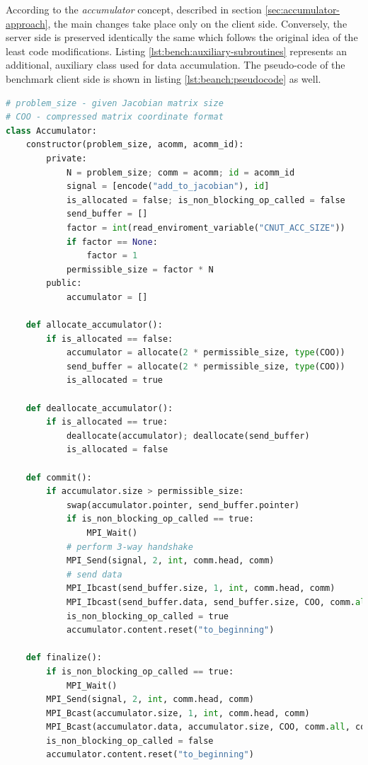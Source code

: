 According to the \textit{accumulator} concept, described in section \ref{sec:accumulator-approach}, the main changes take place only on the client side. Conversely, the server side is preserved identically the same which follows the original idea of the least code modifications. Listing \ref{lst:bench:auxiliary-subroutines} represents an additional, auxiliary class used for data accumulation. The pseudo-code of the benchmark client side is shown in listing \ref{lst:beanch:pseudocode} as well.\\ 


\begin{minipage}{\linewidth}
\begin{lstlisting}[language=python, caption={Pseudocode of the auxiliary class}, frame=single, label={lst:bench:auxiliary-subroutines}]
# problem_size - given Jacobian matrix size
# COO - compressed matrix coordinate format
class Accumulator:
	constructor(problem_size, acomm, acomm_id):
		private:
			N = problem_size; comm = acomm; id = acomm_id
			signal = [encode("add_to_jacobian"), id]
			is_allocated = false; is_non_blocking_op_called = false
			send_buffer = []
			factor = int(read_enviroment_variable("CNUT_ACC_SIZE"))
			if factor == None:
				factor = 1	
			permissible_size = factor * N	
		public: 
			accumulator = []
		
	def allocate_accumulator():
		if is_allocated == false:
			accumulator = allocate(2 * permissible_size, type(COO))			
			send_buffer = allocate(2 * permissible_size, type(COO))
			is_allocated = true

	def deallocate_accumulator():
		if is_allocated == true:
			deallocate(accumulator); deallocate(send_buffer)
			is_allocated = false
	
	def commit():
		if accumulator.size > permissible_size:
			swap(accumulator.pointer, send_buffer.pointer)
			if is_non_blocking_op_called == true:
				MPI_Wait()
			# perform 3-way handshake
			MPI_Send(signal, 2, int, comm.head, comm)
			# send data
			MPI_Ibcast(send_buffer.size, 1, int, comm.head, comm)
			MPI_Ibcast(send_buffer.data, send_buffer.size, COO, comm.all, comm)
			is_non_blocking_op_called = true
			accumulator.content.reset("to_beginning")
					
	def finalize():
		if is_non_blocking_op_called == true:
			MPI_Wait()
		MPI_Send(signal, 2, int, comm.head, comm)
		MPI_Bcast(accumulator.size, 1, int, comm.head, comm)
		MPI_Bcast(accumulator.data, accumulator.size, COO, comm.all, comm)
		is_non_blocking_op_called = false
		accumulator.content.reset("to_beginning")
\end{lstlisting}
\end{minipage}




